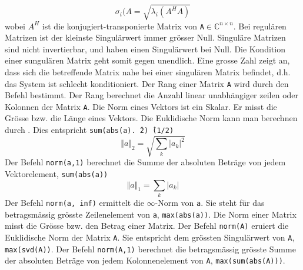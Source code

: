 \begin{equation}
\boxed{\sigma_i(A=\sqrt{\lambda_i(A^HA)}}
\end{equation}
wobei \texttt{$A^H$} ist die konjugiert-transponierte Matrix von \texttt{A$\in\mathbb{C}^{n\times n}$}. Bei regulären Matrizen ist der kleinste Singulärwert immer grösser Null. Singuläre Matrizen sind nicht invertierbar, und haben einen Singulärwert bei Null. Die Kondition einer sungulären Matrix geht somit gegen unendlich. Eine grosse Zahl zeigt an, dass sich die betreffende Matrix nahe bei einer singulären Matrix befindet, d.h. das System ist schlecht konditioniert.
\newline\newline
Der Rang einer Matrix \texttt{A} wird durch den Befehl  bestimmt. Der Rang berechnet die Anzahl linear unabhängiger zeilen oder Kolonnen der Matrix \texttt{A}.
\newline\newline
Die Norm eines Vektors ist ein Skalar. Er misst die Grösse bzw. die Länge eines Vektors. Die Euklidische Norm kann man berechnen durch . Dies entspricht \texttt{sum(abs(a).\^\,2)\^\,(1/2)}
\begin{equation}
\boxed{\Big\Vert a\Big\Vert_2=\sqrt{\displaystyle \sum_{k}\Big\vert a_k\Big\vert^2}}
\end{equation}
Der Befehl {\color{red}\texttt{norm(a,1)}} berechnet die Summe der absoluten Beträge von jedem Vektorelement, \texttt{sum(abs(a))}
\begin{equation}
\boxed{\Vert a\Vert_1=\displaystyle \sum_k\Big\vert a_k\Big\vert}
\end{equation}
Der Befehl {\color{red}\texttt{norm(a, inf)}} ermittelt die $\infty$-Norm von \texttt{a}. Sie steht für das betragsmässig grösste Zeilenelement von \texttt{a}, \texttt{max(abs(a))}.
\newline\newline
Die Norm einer Matrix misst die Grösse bzw. den Betrag einer Matrix. Der Befehl {\color{red}\texttt{norm(A)}} eruiert die Euklidische Norm der Matrix \texttt{A}. Sie entspricht dem grössten Singulärwert von \texttt{A}, \texttt{max(svd(A))}.
\newline\newline
Der Befehl {\color{red}\texttt{norm(A,1)}} berechnet die betragsmässig grösste Summe der absoluten Beträge von jedem Kolonnenelement von \texttt{A}, \texttt{max(sum(abs(A)))}.
\newline\newline

